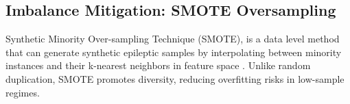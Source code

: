 \documentclass{article}
\begin{document}
				\subsection{Imbalance Mitigation: SMOTE Oversampling}

				Synthetic Minority Over-sampling Technique (SMOTE), 
				is a data level method that can generate synthetic epileptic samples
				by interpolating between minority instances and their k-nearest neighbors in 
				feature space \cite{SMOTEref}. Unlike random duplication, 
				SMOTE promotes diversity, reducing overfitting risks in low-sample regimes. 
				






			\newpage




\end{document}
